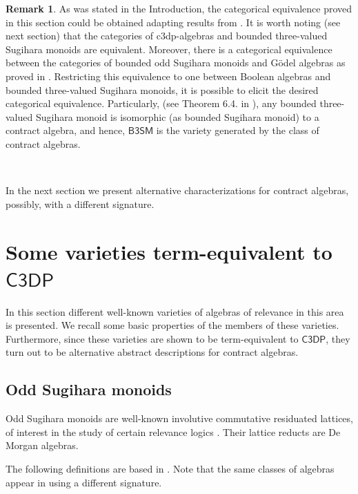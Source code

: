\documentclass[a4paper,11pt]{article}
\theoremstyle{definition}
\newtheorem{rem}[theorem]{Remark}
\newcommand{\hdz}{\mathsf{C3DP}}
\newcommand{\vbtsm}{\mathsf{B3SM}}
\begin{document}
\begin{rem}
As was stated in the Introduction, the categorical equivalence proved in this section could be obtained adapting results from  \cite{GR12}. 
It is worth noting (see next section) that the categories of c3dp-algebras and bounded three-valued Sugihara monoids are equivalent.
Moreover, there is a categorical equivalence between the categories of bounded odd Sugihara monoids and G\"odel algebras as proved in \cite{GR12}.
Restricting this equivalence to one between Boolean algebras and bounded three-valued Sugihara monoids, it is possible to elicit the desired categorical equivalence.
Particularly, (see Theorem 6.4. in \cite{GR12}), any bounded three-valued Sugihara monoid is isomorphic (as bounded Sugihara monoid) to a contract algebra, and hence, $\vbtsm$ is the variety generated by the class of contract algebras. 
\end{rem}

\

In the next section we present alternative characterizations for contract algebras, possibly, with a different signature.



\section{Some varieties term-equivalent to $\hdz$} \label{G3D}

In this section different well-known varieties of algebras of relevance in this area is presented. 
We recall some basic properties of the members of these varieties. 
Furthermore, since these varieties are shown to be term-equivalent to $\hdz$, they turn out to be alternative abstract descriptions for contract algebras.

\subsection{Odd Sugihara monoids}

Odd Sugihara monoids are well-known involutive commutative residuated lattices, of interest in the study of certain relevance logics \cite{MRW}. 
Their lattice reducts are De Morgan algebras. 

The following definitions are based in \cite{MRW}. 
Note that the same classes of algebras appear in \cite{GR12} using a different signature.
\end{document}

